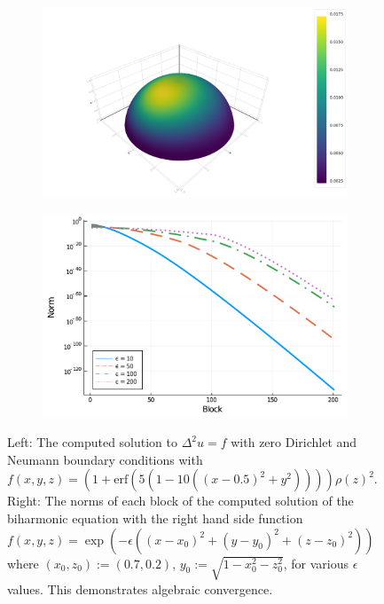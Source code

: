 \documentclass[11pt, oneside]{article}   	%
\begin{document}
\begin{figure}[t]
	\begin{subfigure}{0.5\textwidth}
	\includegraphics[scale=0.15]{biharmonic-f=erf-N=80-n=50}
	\centering
	\end{subfigure}
	\begin{subfigure}{0.5\textwidth}
	\includegraphics[scale=0.3]{solutionblocknorms-biharmonic-expfun-N=200}
	\centering
	\end{subfigure}
	\caption{Left: The computed solution to $\Delta^2 u = f$ with zero Dirichlet and Neumann boundary conditions with $f(x,y,z) = (1 + \text{erf}(5(1 - 10((x - 0.5)^2 + y^2)))) \rho(z)^2$. Right: The norms of each block of the computed solution of the biharmonic equation with the right hand side function $f(x,y,z) = \exp(-\epsilon((x-x_0)^2 + (y-y_0)^2 + (z-z_0)^2))$ where  $(x_0, z_0) := (0.7, 0.2)$, $y_0 := \sqrt{1 - x_0^2 - z_0^2}$, for various $\epsilon$ values. This demonstrates algebraic convergence.}
	\centering
	\label{fig:biharmonic}
\end{figure}
\end{document}
